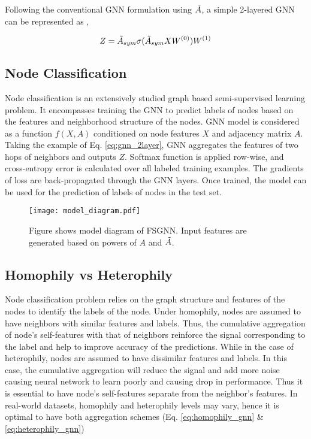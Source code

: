 \documentclass[sigconf,natbib=false]{acmart}
\begin{document}
Following the conventional GNN formulation using $\Tilde{A}$, a simple 2-layered GNN can be represented as \cite{kipf_semi-supervised_2017},

\begin{equation}
    \label{eq:gnn_2layer}
    Z = \Tilde{A}_{sym}\sigma(\Tilde{A}_{sym}XW^{(0)})W^{(1)}
\end{equation}

\subsection{Node Classification}

Node classification is an extensively studied graph based semi-supervised learning problem. It encompasses training the GNN to predict labels of nodes based on the features and neighborhood structure of the nodes. GNN model is considered as a function $f(X,A)$ conditioned on node features $X$ and adjacency matrix $A$. Taking the example of Eq. \ref{eq:gnn_2layer}, GNN aggregates the features of two hops of neighbors and outputs $Z$. Softmax function is applied row-wise, and cross-entropy error is calculated over all labeled training examples. The gradients of loss are back-propagated through the GNN layers. Once trained, the model can be used for the prediction of labels of nodes in the test set.

\begin{figure*}[h]
    \centering
    \texttt{[image: model\_diagram.pdf]}
    \caption{Figure shows model diagram of FSGNN. Input features are generated based on powers of $A$ and $\Tilde{A}$.}
    \label{fig:model_diagram}
\end{figure*}

\subsection{Homophily vs Heterophily}
Node classification problem relies on the graph structure and features of the nodes to identify the labels of the node. Under homophily, nodes are assumed to have neighbors with similar features and labels. Thus, the cumulative aggregation of node's self-features with that of neighbors reinforce the signal corresponding to the label and help to improve accuracy of the predictions. While in the case of heterophily, nodes are assumed to have dissimilar features and labels. In this case, the cumulative aggregation will reduce the signal and add more noise causing neural network to learn poorly and causing drop in performance. Thus it is essential to have node's self-features separate from the neighbor's features. In real-world datasets, homophily and heterophily levels may vary, hence it is optimal to have both aggregation schemes (Eq. \ref{eq:homophily_gnn} \& \ref{eq:heterophily_gnn})
\end{document}
